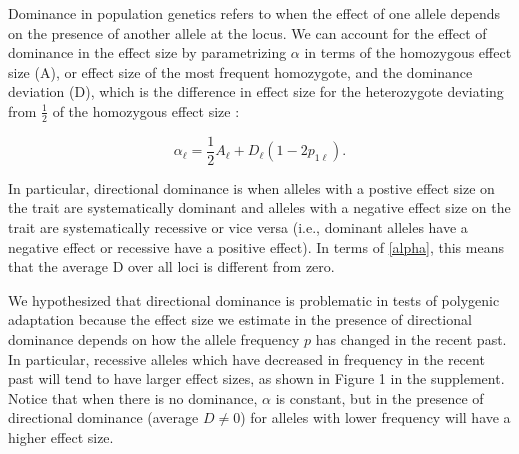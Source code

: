 \documentclass[a4paper,12pt]{article}
\begin{document}

Dominance in population genetics refers to when the effect of one
allele depends on the presence of another allele at the locus. We can account for
the effect of dominance in the effect size by parametrizing $\alpha$
in terms of the homozygous effect size (A), or effect size of the most frequent homozygote, and the
dominance deviation (D), which is the difference in effect size for the heterozygote
deviating from $\frac{1}{2}$ of the homozygous effect size \cite{gillespie}:

\begin{equation}  
  \alpha_\ell = \frac{1}{2} A_\ell + D_\ell\left(1-2p_{1\ell}\right).
  \label{alpha}
\end{equation}

In particular, directional dominance is when alleles with a postive effect
size on the trait are systematically dominant and alleles with a
negative effect size on the trait are systematically recessive or vice
versa (i.e., dominant alleles have a negative effect or recessive have
a positive effect). In terms of \eqref{alpha}, this means that the
average D over all loci is different from zero. 

We hypothesized that directional dominance is problematic in tests of polygenic adaptation
because the effect size we estimate in the presence of directional
dominance depends on how the allele frequency $p$ has changed in the
recent past. In particular, recessive alleles which have decreased in frequency
in the recent past will tend to have larger effect sizes, as shown in
Figure 1 in the supplement. Notice that when there is no dominance,
$\alpha$ is constant, but in the presence of directional dominance
(average $D\neq0$) for alleles with lower frequency will have a higher
effect size. 
\end{document}
